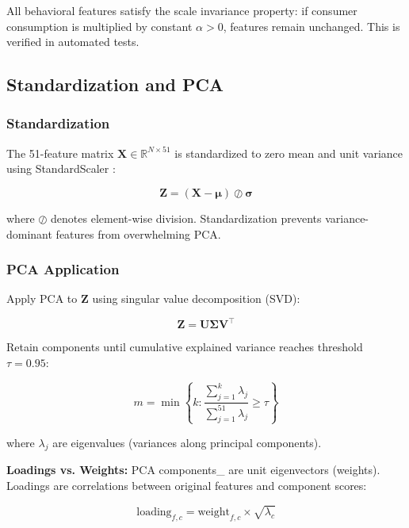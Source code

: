 \documentclass[11pt,a4paper]{article}
\begin{document}
All behavioral features satisfy the scale invariance property: if consumer consumption is multiplied by constant $\alpha > 0$, features remain unchanged. This is verified in automated tests.

\subsection{Standardization and PCA}
\label{sec:pca}

\subsubsection{Standardization}

The 51-feature matrix $\mathbf{X} \in \mathbb{R}^{N \times 51}$ is standardized to zero mean and unit variance using StandardScaler \cite{pedregosa2011scikit}:

\begin{equation}
\mathbf{Z} = (\mathbf{X} - \boldsymbol{\mu}) \oslash \boldsymbol{\sigma}
\end{equation}

where $\oslash$ denotes element-wise division. Standardization prevents variance-dominant features from overwhelming PCA.

\subsubsection{PCA Application}

Apply PCA to $\mathbf{Z}$ using singular value decomposition (SVD):

\begin{equation}
\mathbf{Z} = \mathbf{U} \boldsymbol{\Sigma} \mathbf{V}^\top
\end{equation}

Retain components until cumulative explained variance reaches threshold $\tau = 0.95$:

\begin{equation}
m = \min \left\{ k : \frac{\sum_{j=1}^{k} \lambda_j}{\sum_{j=1}^{51} \lambda_j} \geq \tau \right\}
\end{equation}

where $\lambda_j$ are eigenvalues (variances along principal components).

\textbf{Loadings vs. Weights:} PCA components\_ are unit eigenvectors (weights). Loadings are correlations between original features and component scores:

\begin{equation}
\text{loading}_{f,c} = \text{weight}_{f,c} \times \sqrt{\lambda_c}
\end{equation}
\end{document}
